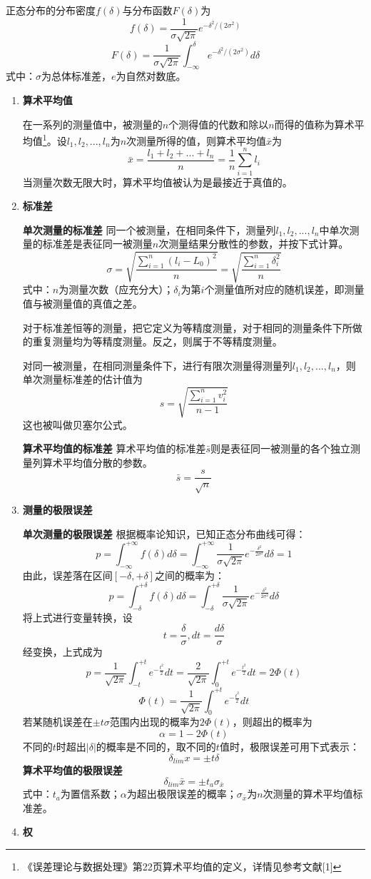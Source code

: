 正态分布的分布密度$ f(\delta) $与分布函数$ F(\delta) $为\[ f(\delta)=\frac{1}{\sigma\sqrt{2\pi}}e^{-\delta^2/(2\sigma^2)} \]\[ F(\delta)=\frac{1}{\sigma\sqrt{2\pi}}\int_{-\infty}^{\delta}e^{-\delta^2/(2\sigma^2)}d\delta \]
式中：$ \sigma $为总体标准差，$ e $为自然对数底。
\begin{enumerate}
	\item \textbf{算术平均值}
	
	\qquad 在一系列的测量值中，被测量的$ n $个测得值的代数和除以$ n $而得的值称为算术平均值\footnote{《误差理论与数据处理》第22页算术平均值的定义，详情见参考文献[1]}。设$ l_1,l_2,...,l_n $为$ n $次测量所得的值，则算术平均值$ \bar{x} $为\[ \bar{x}=\frac{l_1+l_2+...+l_n}{n}=\frac{1}{n}\sum_{i=1}^{n}l_i \]
	当测量次数无限大时，算术平均值被认为是最接近于真值的。
	\item \textbf{标准差}
	
	\textbf{单次测量的标准差 } 同一个被测量，在相同条件下，测量列$ l_1,l_2,...,l_n $中单次测量的标准差是表征同一被测量$ n $次测量结果分散性的参数，并按下式计算。
	\[ \sigma=\sqrt{\frac{\sum\limits_{i=1}^{n}(l_i-L_0)^2}{n}}=\sqrt{\frac{\sum\limits_{i=1}^{n}\delta_i^2}{n}} \]
	式中：$ n $为测量次数（应充分大）；$ \delta_i $为第$ i $个测量值所对应的随机误差，即测量值与被测量值的真值之差。
	
	\qquad 对于标准差恒等的测量，把它定义为等精度测量，对于相同的测量条件下所做的重复测量均为等精度测量。反之，则属于不等精度测量。
	
	\qquad 对同一被测量，在相同测量条件下，进行有限次测量得测量列$ l_1,l_2,...,l_n $，则单次测量标准差的估计值为\[ s=\sqrt{\frac{\sum\limits_{i=1}^{n}v_i^2}{n-1}} \]
	这也被叫做贝塞尔公式。
	
	\textbf{算术平均值的标准差 } 算术平均值的标准差$ \bar{s} $则是表征同一被测量的各个独立测量列算术平均值分散的参数。\[ \bar{s}=\frac{s}{\sqrt{n}} \]
	\item \textbf{测量的极限误差}
	
	\textbf{单次测量的极限误差 } 根据概率论知识，已知正态分布曲线可得：\[ p=\int_{-\infty}^{+\infty}f(\delta)d\delta=\int_{-\infty}^{+\infty}\frac{1}{\sigma\sqrt{2\pi}}e^{-\frac{\delta^2}{2\sigma^2}}d\delta=1 \]
	由此，误差落在区间$ [-\delta,+\delta] $之间的概率为：\[ p=\int_{-\delta}^{+\delta}f(\delta)d\delta=\int_{-\delta}^{+\delta}\frac{1}{\sigma\sqrt{2\pi}}e^{-\frac{\delta^2}{2\sigma^2}}d\delta \]
	将上式进行变量转换，设\[ t=\frac{\delta}{\sigma},dt=\frac{d\delta}{\sigma} \]
	经变换，上式成为\[ p=\frac{1}{\sqrt{2\pi}}\int_{-t}^{+t}e^{-\frac{t^2}{2}}dt=\frac{2}{\sqrt{2\pi}}\int_{0}^{+t}e^{-\frac{t^2}{2}}dt=2\Phi(t) \]
	\[ \Phi(t)=\frac{1}{\sqrt{2\pi}}\int_{0}^{+t}e^{-\frac{t^2}{2}}dt \]
	若某随机误差在$ \pm t\sigma $范围内出现的概率为$ 2\Phi(t) $，则超出的概率为\[ \alpha=1-2\Phi(t) \]
	不同的$ t $时超出$ |\delta| $的概率是不同的，取不同的$ t $值时，极限误差可用下式表示：\[ \delta_{lim}x=\pm t\delta \]
	\textbf{算术平均值的极限误差} \[ \delta_{lim}\bar{x}=\pm t_a\sigma_{\bar{x}} \]
	式中：$ t_a $为置信系数；$ \alpha $为超出极限误差的概率；$ \sigma_{\bar{x}} $为$ n $次测量的算术平均值标准差。
	\item \textbf{权}
	

\end{enumerate}
